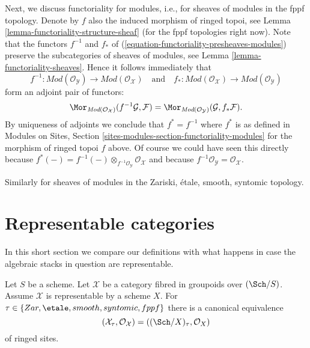 \medskip\noindent
Next, we discuss functoriality for modules, i.e., for sheaves of modules
in the fppf topology. Denote by $f$ also the induced morphism of ringed
topoi, see
Lemma \ref{lemma-functoriality-structure-sheaf}
(for the fppf topologies right now). Note that the functors
$f^{-1}$ and $f_*$ of (\ref{equation-functoriality-presheaves-modules})
preserve the subcategories of sheaves of modules, see
Lemma \ref{lemma-functoriality-sheaves}.
Hence it follows immediately that
\begin{equation}
\label{equation-functoriality-sheaves-modules}
f^{-1} :
\textit{Mod}(\mathcal{O}_\mathcal{Y})
\longrightarrow
\textit{Mod}(\mathcal{O}_\mathcal{X})
\quad\text{and}\quad
f_* :
\textit{Mod}(\mathcal{O}_\mathcal{X})
\longrightarrow
\textit{Mod}(\mathcal{O}_\mathcal{Y})
\end{equation}
form an adjoint pair of functors:
$$
\Mor_{\textit{Mod}(\mathcal{O}_\mathcal{X})}(
f^{-1}\mathcal{G}, \mathcal{F})
=
\Mor_{\textit{Mod}(\mathcal{O}_\mathcal{Y})}(
\mathcal{G}, f_*\mathcal{F}).
$$
By uniqueness of adjoints we conclude that
$f^* = f^{-1}$ where $f^*$ is as defined in
Modules on Sites, Section \ref{sites-modules-section-functoriality-modules}
for the morphism of ringed topoi $f$ above. Of course we could have
seen this directly because
$f^*(-) = f^{-1}(-) \otimes_{f^{-1}\mathcal{O}_\mathcal{Y}}
\mathcal{O}_\mathcal{X}$ and because
$f^{-1}\mathcal{O}_\mathcal{Y} = \mathcal{O}_\mathcal{X}$.

\medskip\noindent
Similarly for sheaves of modules in the Zariski, \'etale, smooth, syntomic
topology.



\section{Representable categories}
\label{section-representable}

\noindent
In this short section we compare our definitions with what happens
in case the algebraic stacks in question are representable.

\begin{lemma}
\label{lemma-compare-with-scheme}
Let $S$ be a scheme. Let $\mathcal{X}$ be a category fibred
in groupoids over $(\Sch/S)$. Assume $\mathcal{X}$ is representable
by a scheme $X$. For $\tau \in \{Zar,\linebreak[0] \etale,\linebreak[0]
smooth,\linebreak[0] syntomic,\linebreak[0] fppf\}$
there is a canonical equivalence
$$
(\mathcal{X}_\tau, \mathcal{O}_\mathcal{X}) =
((\Sch/X)_\tau, \mathcal{O}_X)
$$
of ringed sites.
\end{lemma}

